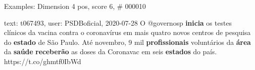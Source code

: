 \begin{frame}{Examples: Dimension 4 pos, score 6, \# 000010}
\footnotesize
\begin{exampleblock}{text: t067493, user: PSDBoficial, 2020-07-28}
O @governosp \textbf{inicia} os testes clínicos da vacina contra o coronavírus 
em mais quatro novos centros de pesquisa do \textbf{estado} de São Paulo. Até 
novembro, 9 mil \textbf{profissionais} voluntários da \textbf{área} da 
\textbf{saúde} \textbf{receberão} as doses da Coronavac em seis 
\textbf{estados} do país. https://t.co/ghmtf0IbWd 
\end{exampleblock}
\end{frame}
